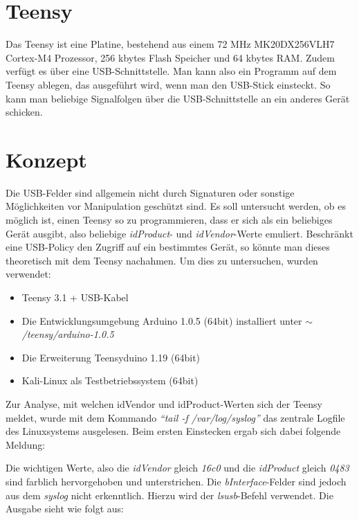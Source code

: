 \section{Teensy}
Das Teensy ist eine Platine, bestehend aus einem 72 MHz MK20DX256VLH7 Cortex-M4 Prozessor, 256 kbytes Flash Speicher und 64 kbytes RAM. Zudem verfügt es über eine USB-Schnittstelle. Man kann also ein Programm auf dem Teensy ablegen, das ausgeführt wird, wenn man den USB-Stick einsteckt. So kann man beliebige Signalfolgen über die USB-Schnittstelle an ein anderes Gerät schicken.
			
\section{Konzept}
Die USB-Felder sind allgemein nicht durch Signaturen oder sonstige Möglichkeiten vor Manipulation geschützt sind. Es soll untersucht werden, ob es möglich ist, einen Teensy so zu programmieren, dass er sich als ein beliebiges Gerät ausgibt, also beliebige \textit{idProduct}- und \textit{idVendor}-Werte emuliert. Beschränkt eine USB-Policy den Zugriff auf ein bestimmtes Gerät, so könnte man dieses theoretisch mit dem Teensy nachahmen.
Um dies zu untersuchen, wurden verwendet:

\begin{itemize}
	\item Teensy 3.1 + USB-Kabel
	\item Die Entwicklungsumgebung Arduino 1.0.5 (64bit) installiert unter \textit{$\sim$/teensy/arduino-1.0.5}
	\item Die Erweiterung Teensyduino 1.19 (64bit)
	\item Kali-Linux als Testbetriebssystem (64bit)
\end{itemize}

Zur Analyse, mit welchen idVendor und idProduct-Werten sich der Teensy meldet, wurde mit dem Kommando \textit{"`tail -f /var/log/syslog"'} das zentrale Logfile des Linuxsystems ausgelesen. Beim ersten Einstecken ergab sich dabei folgende Meldung:

\lstset{language=log}


Die wichtigen Werte, also die \textit{idVendor} gleich \textit{16c0} und die \textit{idProduct} gleich \textit{0483} sind farblich hervorgehoben und unterstrichen. Die \textit{bInterface}-Felder sind jedoch aus dem \textit{syslog} nicht erkenntlich. Hierzu wird der \textit{lsusb}-Befehl verwendet. Die Ausgabe sieht wie folgt aus:


